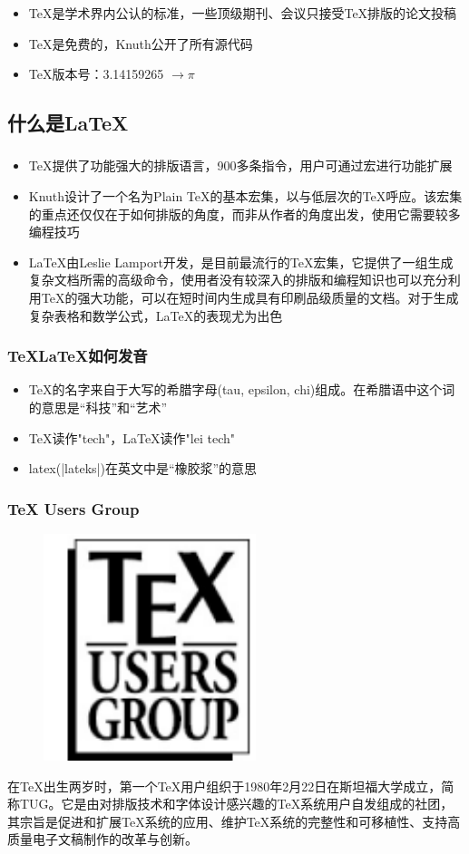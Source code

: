 \documentclass{beamer}
\begin{document}
  \frame
  {
    \frametitle{\subsecname}
    \begin{itemize}
    \item \TeX 是学术界内公认的标准，一些顶级期刊、会议只接受\TeX 排版的论文投稿
    \item \TeX 是免费的，Knuth公开了所有源代码
    \item \TeX 版本号：3.14159265 $\rightarrow \pi$
    \end{itemize}
  }

  \subsection{什么是\LaTeX}
  \frame
  {
    \frametitle{\subsecname}
    \begin{itemize}
    \item \TeX 提供了功能强大的排版语言，900多条指令，用户可通过宏进行功能扩展
    \item Knuth设计了一个名为Plain TeX的基本宏集，以与低层次的TeX呼应。该宏集的重点还仅仅在于如何排版的角度，而非从作者的角度出发，使用它需要较多编程技巧
    \item \LaTeX 由Leslie Lamport开发，是目前最流行的TeX宏集，它提供了一组生成复杂文档所需的高级命令，使用者没有较深入的排版和编程知识也可以充分利用TeX的强大功能，可以在短时间内生成具有印刷品级质量的文档。对于生成复杂表格和数学公式，LaTeX的表现尤为出色
    \end{itemize}
  }

  \frame
  {
    \frametitle{\TeX \LaTeX 如何发音}
    \begin{itemize}
    \item \TeX 的名字来自于大写的希腊字母(tau, epsilon, chi)组成。在希腊语中这个词的意思是“科技”和“艺术”
    \item \TeX 读作"tech"，\LaTeX 读作"lei tech"
    \item latex(|lateks|)在英文中是“橡胶浆”的意思
    \end{itemize}
  }

  \frame
  {
    \frametitle{TeX Users Group}
    \begin{figure}
    \includegraphics[scale=0.5]{TUGlog.pdf}
    \end{figure}
    在TeX出生两岁时，第一个TeX用户组织于1980年2月22日在斯坦福大学成立，简称TUG。它是由对排版技术和字体设计感兴趣的TeX系统用户自发组成的社团，其宗旨是促进和扩展TeX系统的应用、维护TeX系统的完整性和可移植性、支持高质量电子文稿制作的改革与创新。
  }
\end{document}
